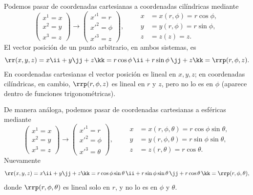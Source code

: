 \begin{ejemplo}
Podemos pasar de coordenadas cartesianas a coordenadas cilíndricas mediante
\begin{equation}
\begin{pmatrix} x^1=x \\ x^2=y \\ x^3=z\end{pmatrix}
\longrightarrow
\begin{pmatrix} x'^1=r \\ x'^2=\phi \\ x'^3=z\end{pmatrix},
\qquad
\begin{aligned}
x&=x(r,\phi)=r\cos\phi,\\
y&=y(r,\phi)=r\sin\phi,\\
z&=z(z)=z .
\end{aligned}
\end{equation}
El vector posición de un punto arbitrario, en ambos sistemas, es
\begin{equation}
\rr(x,y,z) = x\ii + y\jj + z\kk = r\cos\phi\,\ii + r\sin\phi\,\jj + z\kk = \rrp(r,\phi,z).
\end{equation}
En coordenadas cartesianas el vector posición es lineal en $x,y,z$; en coordenadas cilíndricas, en cambio, $\rrp(r,\phi,z)$ es lineal en $r$ y $z$, pero no lo es en $\phi$ (aparece dentro de funciones trigonométricas).
\end{ejemplo}

\begin{ejemplo}
De manera análoga, podemos pasar de coordenadas cartesianas a esféricas mediante
\begin{equation}
\begin{pmatrix} x^1=x \\ x^2=y \\ x^3=z\end{pmatrix}
\longrightarrow
\begin{pmatrix} x'^1=r \\ x'^2=\phi \\ x'^3=\theta\end{pmatrix},
\qquad
\begin{aligned}
x&=x(r,\phi,\theta)=r\cos\phi\sin\theta,\\
y&=y(r,\phi,\theta)=r\sin\phi\sin\theta,\\
z&=z(r,\theta)=r\cos\theta .
\end{aligned}
\end{equation}
Nuevamente
\begin{equation}
\rr(x,y,z)=x\ii+y\jj+z\kk = r\cos\phi\sin\theta\,\ii + r\sin\phi\sin\theta\,\jj + r\cos\theta\,\kk = \rrp(r,\phi,\theta),
\end{equation}
donde $\rrp(r,\phi,\theta)$ es lineal solo en $r$, y no lo es en $\phi$ y $\theta$.
\end{ejemplo}


